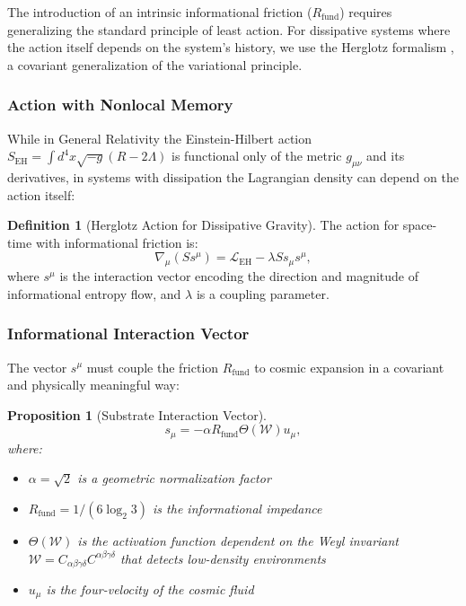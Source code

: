 \documentclass[11pt, a4paper]{article}
\theoremstyle{plain}
\newtheorem{proposition}[theorem]{Proposition}
\theoremstyle{definition}
\newtheorem{definition}[theorem]{Definition}
\newcommand{\Rfactor}{R_{\text{fund}}}
\begin{document}
The introduction of an intrinsic informational friction ($\Rfactor$) requires generalizing the standard principle of least action. For dissipative systems where the action itself depends on the system's history, we use the Herglotz formalism \cite{Herglotz1930}, a covariant generalization of the variational principle.

\subsubsection{Action with Nonlocal Memory}

While in General Relativity the Einstein-Hilbert action $S_{\text{EH}} = \int d^4x \sqrt{-g}(R - 2\Lambda)$ is functional only of the metric $g_{\mu\nu}$ and its derivatives, in systems with dissipation the Lagrangian density can depend on the action itself:

\begin{definition}[Herglotz Action for Dissipative Gravity]
The action for space-time with informational friction is:
\begin{equation}
\nabla_\mu (S s^\mu) = \mathcal{L}_{\text{EH}} - \lambda S s_\mu s^\mu,
\label{eq:herglotz_action}
\end{equation}
where $s^\mu$ is the interaction vector encoding the direction and magnitude of informational entropy flow, and $\lambda$ is a coupling parameter.
\end{definition}

\subsubsection{Informational Interaction Vector}

The vector $s^\mu$ must couple the friction $\Rfactor$ to cosmic expansion in a covariant and physically meaningful way:

\begin{proposition}[Substrate Interaction Vector]
\begin{equation}
s_\mu = -\alpha \Rfactor \Theta(\mathcal{W}) u_\mu,
\label{eq:interaction_vector}
\end{equation}
where:
\begin{itemize}
    \item $\alpha = \sqrt{2}$ is a geometric normalization factor
    \item $\Rfactor = 1/(6\log_2 3)$ is the informational impedance
    \item $\Theta(\mathcal{W})$ is the activation function dependent on the Weyl invariant $\mathcal{W} = C_{\alpha\beta\gamma\delta}C^{\alpha\beta\gamma\delta}$ that detects low-density environments
    \item $u_\mu$ is the four-velocity of the cosmic fluid
\end{itemize}
\end{proposition}
\end{document}
